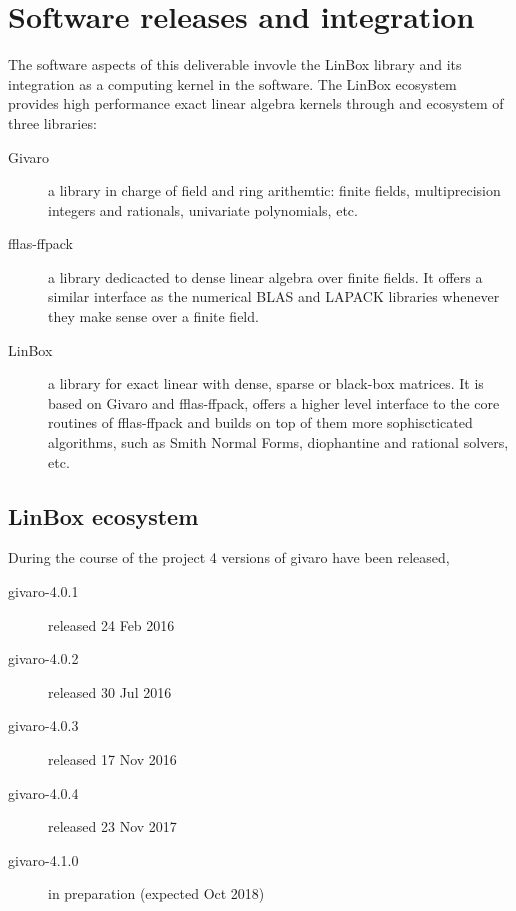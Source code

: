 \documentclass{deliverablereport}
\begin{document}
\section{Software releases and integration}

The software aspects of this deliverable invovle the LinBox library
and its integration as a computing kernel in the \Sage software.
The LinBox ecosystem provides high performance exact linear algebra kernels
through and ecosystem of three libraries:
\begin{description}
  \item[Givaro] a library in charge of field and ring arithemtic: finite
    fields, multiprecision integers and rationals, univariate polynomials, etc.
  \item[fflas-ffpack] a library dedicacted to dense linear algebra over finite
    fields. It offers a similar interface as the numerical BLAS and LAPACK
    libraries whenever they make sense over a finite field.
  \item[LinBox] a library for exact linear with dense, sparse or black-box
    matrices. It is based on Givaro and fflas-ffpack, offers a higher level interface
    to the core routines of fflas-ffpack and builds on top of them more
    sophiscticated algorithms, such as Smith Normal Forms, diophantine and
    rational solvers, etc.
  \end{description}

\subsection{LinBox ecosystem}

During the course of the project 4 versions of givaro have been released, 
\begin{description}
  \item[givaro-4.0.1] released 24 Feb 2016
  \item[givaro-4.0.2] released 30 Jul 2016
  \item[givaro-4.0.3] released 17 Nov 2016
  \item[givaro-4.0.4] released 23 Nov 2017
  \item[givaro-4.1.0] in preparation (expected Oct 2018)
\end{description}
\end{document}
